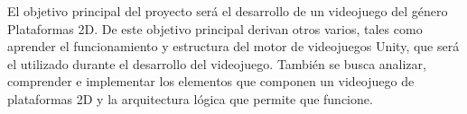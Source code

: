 
El objetivo principal del proyecto será el desarrollo de un videojuego del género Plataformas 2D. De este objetivo principal derivan otros varios, tales como aprender el funcionamiento y estructura del motor de videojuegos Unity, que será el utilizado durante el desarrollo del videojuego. También se busca analizar, comprender e implementar los elementos que componen un videojuego de plataformas 2D y la arquitectura lógica que permite que funcione.
